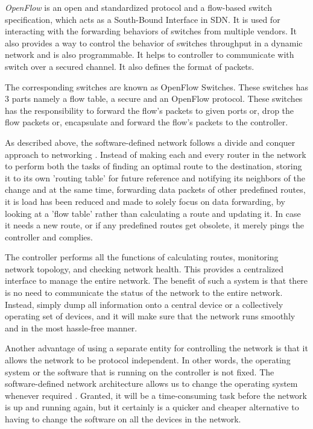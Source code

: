     \textit{OpenFlow} is an open and standardized protocol and a flow-based switch specification, which acts as a South-Bound Interface in SDN. It is used for interacting with the forwarding behaviors of switches from multiple vendors. It also provides a way to control the behavior of switches throughput in a dynamic network and is also programmable. It helps to controller to communicate with switch over a secured channel. It also defines the format of packets.
    
    The corresponding switches are known as OpenFlow Switches. These switches has 3 parts namely a flow table, a secure and an OpenFlow protocol. These switches has the responsibility to forward the flow's packets to given ports or, drop the flow packets or, encapsulate and forward the flow's packets to the controller.

    As described above, the software-defined network follows a divide and conquer approach to networking \cite{taxonomy2014}. Instead of making each and every router in the network to perform both the tasks of finding an optimal route to the destination, storing it to its own 'routing table' for future reference and notifying its neighbors of the change and at the same time, forwarding data packets of other predefined routes, it is load has been reduced and made to solely focus on data forwarding, by looking at a 'flow table' rather than calculating a route and updating it. In case it needs a new route, or if any predefined routes get obsolete, it merely pings the controller and complies.
    
     The controller performs all the functions of calculating routes, monitoring network topology, and checking network health. This provides a centralized interface to manage the entire network. The benefit of such a system is that there is no need to communicate the status of the network to the entire network. Instead, simply dump all information onto a central device or a collectively operating set of devices, and it will make sure that the network runs smoothly and in the most hassle-free manner.
     
    Another advantage of using a separate entity for controlling the network is that it allows the network to be protocol independent. In other words, the operating system or the software that is running on the controller is not fixed. The software-defined network architecture allows us to change the operating system whenever required \cite{arpanet2004}. Granted, it will be a time-consuming task before the network is up and running again, but it certainly is a quicker and cheaper alternative to having to change the software on all the devices in the network.

